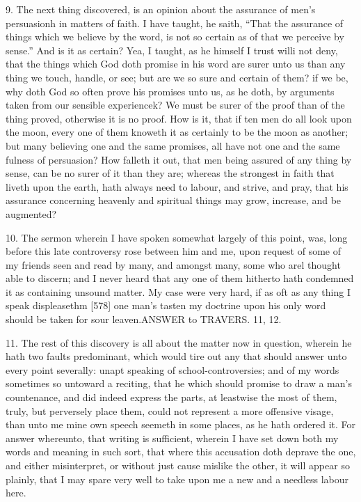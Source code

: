 9. The next thing discovered, is an opinion about the assurance of men’s persuasionh in matters of faith. I have taught, he saith, “That the assurance of things which we believe by the word, is not so certain as of that we perceive by sense.” And is it as certain? Yea, I taught, as he himself I trust willi not deny, that the things which God doth promise in his word are surer unto us than any thing we touch, handle, or see; but are we so sure and certain of them? if we be, why doth God so often prove his promises unto us, as he doth, by arguments taken from our sensible experiencek? We must be surer of the proof than of the thing proved, otherwise it is no proof. How is it, that if ten men do all look upon the moon, every one of them knoweth it as certainly to be the moon as another; but many believing one and the same promises, all have not one and the same fulness of persuasion? How falleth it out, that men being assured of any thing by sense, can be no surer of it than they are; whereas the strongest in faith that liveth upon the earth, hath always need to labour, and strive, and pray, that his assurance concerning heavenly and spiritual things may grow, increase, and be augmented?

10. The sermon wherein I have spoken somewhat largely of this point, was, long before this late controversy rose between him and me, upon request of some of my friends seen and read by many, and amongst many, some who arel thought able to discern; and I never heard that any one of them hitherto hath condemned it as containing unsound matter. My case were very hard, if as oft as any thing I speak displeasethm [578] one man’s tasten my doctrine upon his only word should be taken for sour leaven.ANSWER to TRAVERS. 11, 12.

11. The rest of this discovery is all about the matter now in question, wherein he hath two faults predominant, which would tire out any that should answer unto every point severally: unapt speaking of school-controversies; and of my words sometimes so untoward a reciting, that he which should promise to draw a man’s countenance, and did indeed express the parts, at leastwise the most of them, truly, but perversely place them, could not represent a more offensive visage, than unto me mine own speech seemeth in some places, as he hath ordered it. For answer whereunto, that writing is sufficient, wherein I have set down both my words and meaning in such sort, that where this accusation doth deprave the one, and either misinterpret, or without just cause mislike the other, it will appear so plainly, that I may spare very well to take upon me a new and a needless labour here.


